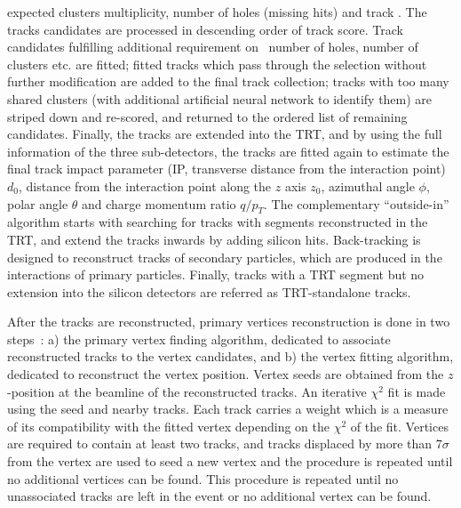expected clusters multiplicity, number of holes (missing hits) and track \pt. 
The tracks candidates are processed in descending order of 
track score. Track candidates fulfilling additional requirement 
on \pt\, number of holes, number of clusters etc. are fitted;
fitted tracks which pass through the selection without further modification
are added to the final track collection; tracks with too many shared clusters 
(with additional artificial neural network to identify them) are striped down and re-scored, 
and returned to the ordered list of remaining candidates. 
Finally, the tracks are extended into the TRT, and by using the full information
of the three sub-detectors, the tracks are fitted again to estimate the final track
impact parameter (IP, transverse distance from the interaction point) $d_0$, 
distance from the interaction point along the $z$ axis $z_0$,
azimuthal angle $\phi$, polar angle $\theta$ and charge momentum ratio $q/p_T$.
The complementary ``outside-in'' algorithm starts with searching for tracks with segments 
reconstructed in the TRT, and extend the tracks inwards by adding silicon hits. 
Back-tracking is designed to reconstruct tracks of secondary particles, which are
produced in the interactions of primary particles.
Finally, tracks with a TRT segment but no extension into the silicon detectors
are referred as TRT-standalone tracks. 

After the tracks are reconstructed, primary vertices reconstruction is done in two steps~\cite{ATLAS-CONF-2010-069}:
a) the primary vertex finding algorithm, dedicated to associate reconstructed tracks to the vertex candidates, 
and b) the vertex fitting algorithm, dedicated to reconstruct the vertex position. 
Vertex seeds are obtained from the $z$-position at the beamline of the reconstructed tracks. 
An iterative $\chi^2$ fit is made using the seed and nearby tracks. 
Each track carries a weight which is a measure of its compatibility 
with the fitted vertex depending on the $\chi^2$ of the fit. 
Vertices are required to contain at least two tracks, and 
tracks displaced by more than 7$\sigma$ from the vertex are used to
seed a new vertex and the procedure is repeated until no additional vertices can be found. 
This procedure is repeated until no unassociated tracks are left in the event or no
additional vertex can be found. 




